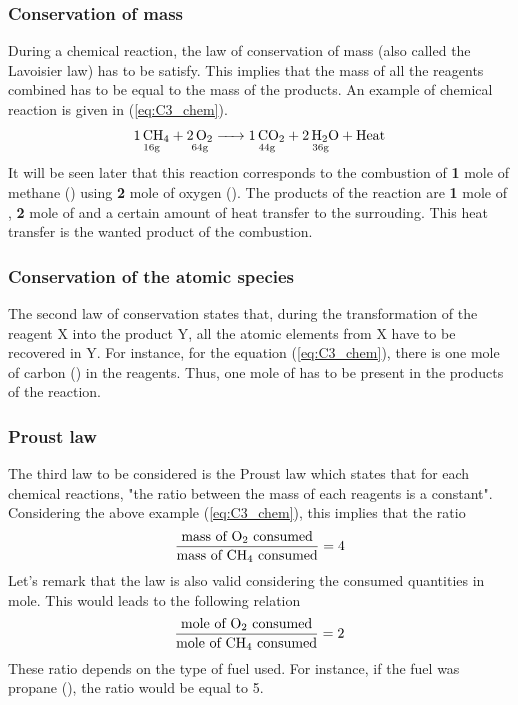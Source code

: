 \subsubsection{Conservation of mass}
During a chemical reaction, the law of conservation of mass (also called the Lavoisier law) has to be satisfy. This implies that the mass of all the reagents combined has to be equal to the mass of the products. An example of chemical reaction is given in (\ref{eq:C3_chem}).
\begin{equation}
\underset{\mathrm{16g}}{\ce{1CH4}} \ce{+} \underset{\mathrm{64g}}{\ce{2O2}} \ce{->} \underset{\mathrm{44g}}{\ce{1CO2}} \ce{+} \underset{\mathrm{36g}}{\ce{2H2O}} \ce{+}\text{Heat}\label{eq:C3_chem}
\end{equation}
It will be seen later that this reaction corresponds to the combustion of \textbf{1} mole of methane () using \textbf{2} mole of oxygen (). The products of the reaction are \textbf{1} mole of , \textbf{2} mole of  and a certain amount of heat transfer to the surrouding. This heat transfer is the wanted product of the combustion. 

\subsubsection{Conservation of the atomic species}
The second law of conservation states that, during the transformation of the reagent X into the product Y, all the atomic elements from X have to be recovered in Y. For instance, for the equation (\ref{eq:C3_chem}), there is one mole of carbon () in the reagents. Thus, one mole of  has to be present in the products of the reaction.
\newpage
\subsubsection{Proust law}
The third law to be considered is the Proust law which states that for each chemical reactions, "the ratio between the mass of each reagents is a constant". Considering the above example (\ref{eq:C3_chem}), this implies that the ratio
\begin{equation}
\frac{\text{mass of \ce{O2} consumed}}{\text{mass of \ce{CH4} consumed}} = 4 
\end{equation}
Let's remark that the law is also valid considering the consumed quantities in mole. This would leads to the following relation
\begin{equation}
\frac{\text{mole of \ce{O2} consumed}}{\text{mole of \ce{CH4} consumed}} = 2  \label{eq:C3_molratio}
\end{equation}
These ratio depends on the type of fuel used. For instance, if the fuel was propane (), the ratio would be equal to 5.
 
